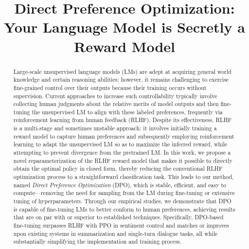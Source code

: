 \title{Direct Preference Optimization: Your Language Model is Secretly a Reward Model}

\begin{abstract}
Large-scale unsupervised language models (LMs) are adept at acquiring general world knowledge and certain reasoning abilities; however, it remains challenging to exercise fine-grained control over their outputs because their training occurs without supervision. Current approaches to increase such controllability typically involve collecting human judgments about the relative merits of model outputs and then fine-tuning the unsupervised LM to align with these labeled preferences, frequently via reinforcement learning from human feedback (RLHF). Despite its effectiveness, RLHF is a multi-stage and sometimes unstable approach: it involves initially training a reward model to capture human preferences and subsequently employing reinforcement learning to adapt the unsupervised LM so as to maximize the inferred reward, while attempting to prevent divergence from the pretrained LM. In this work, we propose a novel reparameterization of the RLHF reward model that makes it possible to directly obtain the optimal policy in closed form, thereby reducing the conventional RLHF optimization process to a straightforward classification task. This leads to our method, named \textit{Direct Preference Optimization} (DPO), which is stable, efficient, and easy to compute—removing the need for sampling from the LM during fine-tuning or extensive tuning of hyperparameters. Through our empirical studies, we demonstrate that DPO is capable of fine-tuning LMs to better conform to human preferences, achieving results that are on par with or superior to established techniques. Specifically, DPO-based fine-tuning surpasses RLHF with PPO in sentiment control and matches or improves upon existing systems in summarization and single-turn dialogue tasks, all while substantially simplifying the implementation and training process.
\end{abstract}


